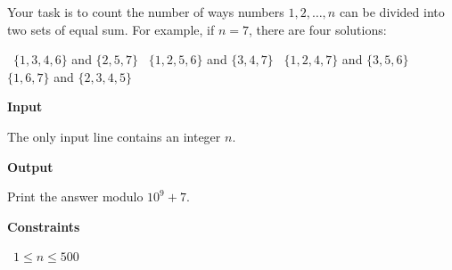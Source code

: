 Your task is to count the number of ways numbers $1,2,\ldots,n$ can be divided into two sets of equal sum.
For example, if $n=7$, there are four solutions:

\textbullet\ $\{1,3,4,6\}$ and $\{2,5,7\}$
\textbullet\ $\{1,2,5,6\}$ and $\{3,4,7\}$
\textbullet\ $\{1,2,4,7\}$ and $\{3,5,6\}$
\textbullet\ $\{1,6,7\}$ and $\{2,3,4,5\}$

\vspace{0.3cm}\noindent\textbf{Input}

The only input line contains an integer $n$.

\vspace{0.3cm}\noindent\textbf{Output}

Print the answer modulo $10^9+7$.

\vspace{0.3cm}\noindent\textbf{Constraints}

\textbullet\ $1 \le n \le 500$